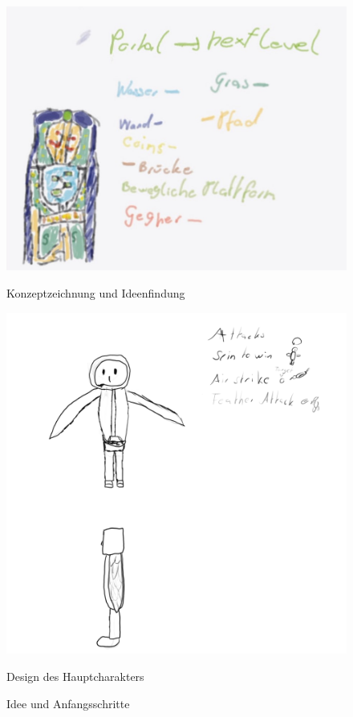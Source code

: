   \begin{figure}[h]
    \centering
    \begin{minipage}[b]{0.45\textwidth}
      \centering
      \includegraphics[width=\textwidth]{chapters/04/images/V1/drawing.jpg}
      \caption{Konzeptzeichnung und Ideenfindung}
      \label{fig:PE01}
    \end{minipage}
    \hfill
    \begin{minipage}[b]{0.45\textwidth}
      \centering
      \includegraphics[width=\textwidth]{chapters/04/images/V1/CharScetch.png}
      \caption{Design des Hauptcharakters}
      \label{fig:PE02}
    \end{minipage}
    \caption{Idee und Anfangsschritte}
    \label{fig:IdeeThema}
  \end{figure}

